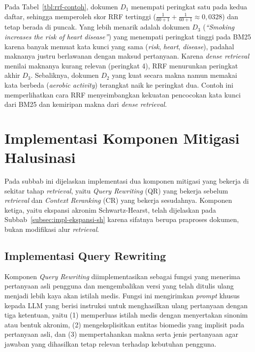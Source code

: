 Pada Tabel~\ref{tbl:rrf-contoh}, dokumen $D_1$ menempati peringkat satu pada kedua daftar, sehingga memperoleh skor RRF tertinggi ($\frac{1}{60+1} + \frac{1}{60+1} \approx 0{,}0328$) dan tetap berada di puncak. Yang lebih menarik adalah dokumen $D_3$ (\textit{``Smoking increases the risk of heart disease''}) yang menempati peringkat tinggi pada BM25 karena banyak memuat kata kunci yang sama (\textit{risk}, \textit{heart}, \textit{disease}), padahal maknanya justru berlawanan dengan maksud pertanyaan. Karena \textit{dense retrieval} menilai maknanya kurang relevan (peringkat 4), RRF menurunkan peringkat akhir $D_3$. Sebaliknya, dokumen $D_2$ yang kuat secara makna namun memakai kata berbeda (\textit{aerobic activity}) terangkat naik ke peringkat dua. Contoh ini memperlihatkan cara RRF menyeimbangkan kekuatan pencocokan kata kunci dari BM25 dan kemiripan makna dari \textit{dense retrieval}.


\section{Implementasi Komponen Mitigasi Halusinasi}
\label{sec:impl-mitigasi}

Pada subbab ini dijelaskan implementasi dua komponen mitigasi yang bekerja di sekitar tahap \textit{retrieval}, yaitu \textit{Query Rewriting} (QR) yang bekerja sebelum \textit{retrieval} dan \textit{Context Reranking} (CR) yang bekerja sesudahnya. Komponen ketiga, yaitu ekspansi akronim Schwartz-Hearst, telah dijelaskan pada Subbab~\ref{subsec:impl-ekspansi-sh} karena sifatnya berupa praproses dokumen, bukan modifikasi alur \textit{retrieval}.

\subsection{Implementasi Query Rewriting}
\label{subsec:impl-qr}

Komponen \textit{Query Rewriting} diimplementasikan sebagai fungsi yang menerima pertanyaan asli pengguna dan mengembalikan versi yang telah ditulis ulang menjadi lebih kaya akan istilah medis. Fungsi ini mengirimkan \textit{prompt} khusus kepada LLM yang berisi instruksi untuk menghasilkan ulang pertanyaan dengan tiga ketentuan, yaitu (1) memperluas istilah medis dengan menyertakan sinonim atau bentuk akronim, (2) mengeksplisitkan entitas biomedis yang implisit pada pertanyaan asli, dan (3) mempertahankan makna serta jenis pertanyaan agar jawaban yang dihasilkan tetap relevan terhadap kebutuhan pengguna.

